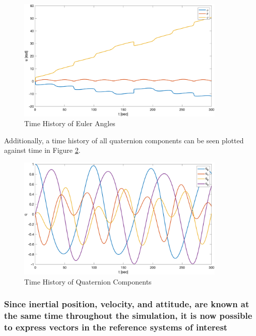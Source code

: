 \begin{figure} [H]
    \centering
    \captionsetup{justification = centering}
    \includegraphics[width = 10cm] {Images/time_history_EA.png}
    \caption{Time History of Euler Angles}
    \label{fig:time_history_EA}
\end{figure}

Additionally, a time history of all quaternion components can be seen plotted against time in Figure \ref{fig:time_history_quaternion}. 

\begin{figure} [H]
    \centering
    \captionsetup{justification = centering}
    \includegraphics[width = 10cm] {Images/time_history_quat.png}
    \caption{Time History of Quaternion Components}
    \label{fig:time_history_quaternion}
\end{figure}

\subsubsection{Since inertial position, velocity, and attitude, are known at the same time throughout the simulation, it is now possible to express vectors in the reference systems of interest}

